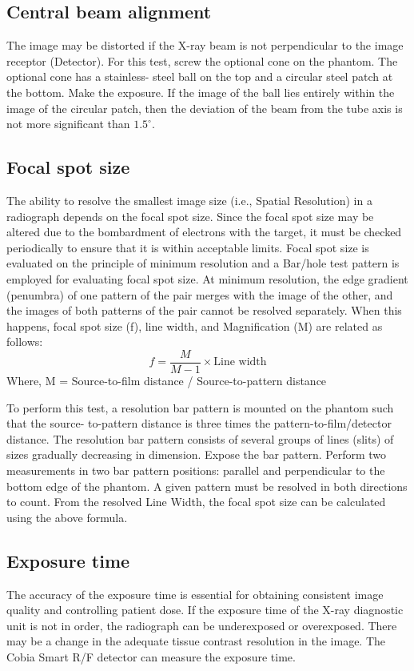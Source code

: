 \subsection{Central beam alignment}
The image may be distorted if the X-ray beam is not perpendicular to the image receptor (Detector). For this test, screw the optional cone on the phantom. The optional cone has a stainless- steel ball on the top and a circular steel patch at the bottom. Make the exposure. If the image of the ball lies entirely within the image of the circular patch, then the deviation of the beam from the tube axis is not more significant than $1.5^\circ$.
\subsection{Focal spot size}
The ability to resolve the smallest image size (i.e., Spatial Resolution) in a radiograph depends on the focal spot size. Since the focal spot size may be altered due to the bombardment of electrons with the target, it must be checked periodically to ensure that it is within acceptable limits. Focal spot size is evaluated on the principle of minimum resolution and a Bar/hole test pattern is employed for evaluating focal spot size. At minimum resolution, the edge gradient (penumbra) of one pattern of the pair merges with the image of the other, and the images of both patterns of the pair cannot be resolved separately. When this happens, focal spot size (f), line width, and Magnification (M) are related as follows: 
\[f = \frac{M}{M-1} \times \text{Line width}\]
Where, M = Source-to-film distance / Source-to-pattern distance

To perform this test, a resolution bar pattern is mounted on the phantom such that the source- to-pattern distance is three times the pattern-to-film/detector distance. The resolution bar pattern consists of several groups of lines (slits) of sizes gradually decreasing in dimension. Expose the bar pattern. Perform two measurements in two bar pattern positions: parallel and perpendicular to the bottom edge of the phantom. A given pattern must be resolved in both directions to count. From the resolved Line Width, the focal spot size can be calculated using the above formula.
\subsection{Exposure time}
The accuracy of the exposure time is essential for obtaining consistent image quality and controlling patient dose. If the exposure time of the X-ray diagnostic unit is not in order, the radiograph can be underexposed or overexposed. There may be a change in the adequate tissue contrast resolution in the image. The Cobia Smart R/F detector can measure the exposure time.

